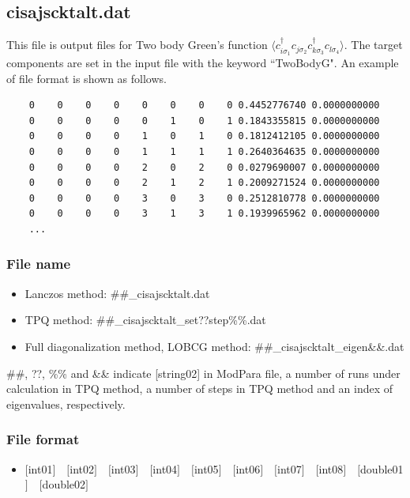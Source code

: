 \newpage
\subsection{cisajscktalt.dat}
\label{Subsec:cisajscktalt}
This file is output files for Two body Green's function $\langle c_{i\sigma_1}^{\dagger}c_{j\sigma_2}c_{k\sigma_3}^{\dagger}c_{l\sigma_4}\rangle$. 
The target components are set in the input file with the keyword ``TwoBodyG".
An example of file format is shown as follows.

\begin{minipage}{15cm}
\begin{screen}
\begin{verbatim}
    0    0    0    0    0    0    0    0 0.4452776740 0.0000000000
    0    0    0    0    0    1    0    1 0.1843355815 0.0000000000
    0    0    0    0    1    0    1    0 0.1812412105 0.0000000000
    0    0    0    0    1    1    1    1 0.2640364635 0.0000000000
    0    0    0    0    2    0    2    0 0.0279690007 0.0000000000
    0    0    0    0    2    1    2    1 0.2009271524 0.0000000000
    0    0    0    0    3    0    3    0 0.2512810778 0.0000000000
    0    0    0    0    3    1    3    1 0.1939965962 0.0000000000
    ...
\end{verbatim}
\end{screen}
\end{minipage}

\subsubsection{File name}
 \begin{itemize}
   \item{Lanczos method:}  \#\#\_cisajscktalt.dat
   \item{TPQ method:} \#\#\_cisajscktalt\_set??step\%\%.dat
   \item{Full diagonalization method, LOBCG method:}  \#\#\_cisajscktalt\_eigen{\&\&}.dat
  \end{itemize}
  \#\#, ??, \%\% and \&\& indicate [string02] in ModPara file, a number of runs under calculation in TPQ method, a number of steps in TPQ method and an index of eigenvalues, respectively.


\subsubsection{File format}
 \begin{itemize}
   \item  $[$int01$]$~~$[$int02$]$~~$[$int03$]$~~$[$int04$]$~~$[$int05$]$~~$[$int06$]$~~$[$int07$]$~~$[$int08$]$~~$[$double01$]$~~$[$double02$]$
  \end{itemize}


